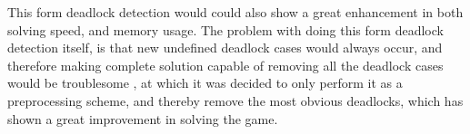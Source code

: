  
 


 
This form deadlock detection would could also show a great enhancement in both solving speed, and memory usage. 
The problem with doing this form deadlock detection itself, is that new undefined deadlock cases would always occur,  and therefore making complete solution capable of  removing all the deadlock cases would be troublesome , at which it was decided to only perform it as a preprocessing scheme, and thereby remove the most obvious deadlocks, which has shown a great improvement in solving the game. 




